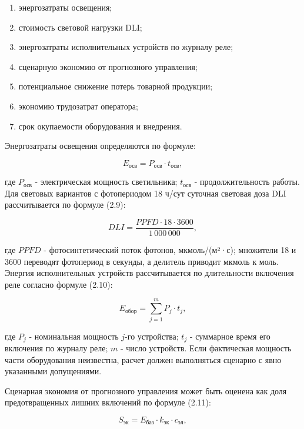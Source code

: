 \documentclass[a4paper,14pt]{extarticle}
\providecommand{\tightlist}{%
  \setlength{\itemsep}{0pt}\setlength{\parskip}{0pt}}
\begin{document}
\begin{enumerate}
\def\labelenumi{\arabic{enumi})}
\tightlist
\item
  энергозатраты освещения;
\item
  стоимость световой нагрузки DLI;
\item
  энергозатраты исполнительных устройств по журналу реле;
\item
  сценарную экономию от прогнозного управления;
\item
  потенциальное снижение потерь товарной продукции;
\item
  экономию трудозатрат оператора;
\item
  срок окупаемости оборудования и внедрения.
\end{enumerate}

Энергозатраты освещения определяются по формуле:

\begin{equation}
E_{\text{осв}} = P_{\text{осв}} \cdot t_{\text{осв}},
\tag{2.8}
\end{equation}

где \(P_{\text{осв}}\) - электрическая мощность светильника;
\(t_{\text{осв}}\) - продолжительность работы. Для световых вариантов с
фотопериодом 18 ч/сут суточная световая доза DLI рассчитывается по
формуле (2.9):

\begin{equation}
DLI = \frac{PPFD \cdot 18 \cdot 3600}{1\,000\,000},
\tag{2.9}
\end{equation}

где \(PPFD\) - фотосинтетический поток фотонов, мкмоль/(м²·с); множители
18 и 3600 переводят фотопериод в секунды, а делитель приводит мкмоль к
моль. Энергия исполнительных устройств рассчитывается по длительности
включения реле согласно формуле (2.10):

\begin{equation}
E_{\text{обор}} = \sum_{j=1}^{m} P_j \cdot t_j,
\tag{2.10}
\end{equation}

где \(P_j\) - номинальная мощность \(j\)-го устройства; \(t_j\) -
суммарное время его включения по журналу реле; \(m\) - число устройств.
Если фактическая мощность части оборудования неизвестна, расчет должен
выполняться сценарно с явно указанными допущениями.

Сценарная экономия от прогнозного управления может быть оценена как доля
предотвращенных лишних включений по формуле (2.11):

\begin{equation}
S_{\text{эк}} = E_{\text{баз}} \cdot k_{\text{эк}} \cdot c_{\text{эл}},
\tag{2.11}
\end{equation}
\end{document}
